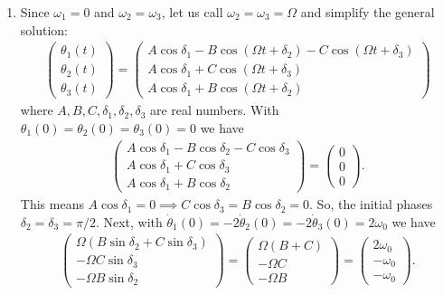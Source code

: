 \documentclass{article}
\theoremstyle{definition}
\begin{document}
\begin{enumerate}[label=(\alph*)]
	\item Since $\omega_1 = 0$ and $\omega_2=\omega_3$, let us call $\omega_2 = \omega_3 = \Omega$ and simplify the general solution: 
	\begin{align*}
	\begin{pmatrix}
	\theta_1(t)\\
	\theta_2(t)\\
	\theta_3(t)
	\end{pmatrix}=
	\begin{pmatrix}
	A\cos\delta_1 - B\cos(\Omega t + \delta_2) - C\cos(\Omega t + \delta_3)\\
	A \cos\delta_1 + C\cos(\Omega t + \delta_3) \\
	A \cos\delta_1 + B\cos(\Omega t + \delta_2)
	\end{pmatrix}
	\end{align*}
	where $A,B,C,\delta_1,\delta_2,\delta_3$ are real numbers. With $\theta_1(0) = \theta_2(0) = \theta_3(0) = 0$ we have
	\begin{align*}
	\begin{pmatrix}
	A\cos\delta_1 - B\cos\delta_2 - C\cos\delta_3 \\
	A\cos\delta_1+C\cos\delta_3 \\
	A\cos\delta_1+B\cos\delta_2
	\end{pmatrix}
	= \begin{pmatrix}
	0\\0\\0
	\end{pmatrix}.
	\end{align*}
	This means $A\cos\delta_1 = 0 \implies C\cos\delta_3 = B\cos\delta_2 = 0$. So, the initial phases $\delta_2 = \delta_3 = \pi/2$. Next, with $\dot\theta_1(0) = -2\dot\theta_2(0) = -2\dot\theta_3(0) = 2\omega_0$ we have
	\begin{align*}
	\begin{pmatrix}
	\Omega (B\sin\delta_2 + C\sin\delta_3) \\ 
	-\Omega C\sin\delta_3 \\
	-\Omega B\sin\delta_2  
	\end{pmatrix}
	=
	\begin{pmatrix}
	\Omega(B+C)\\ -\Omega C \\ -\Omega B
	\end{pmatrix}
	=
	\begin{pmatrix}
	2\omega_0 \\-\omega_0 \\ -\omega_0
	\end{pmatrix}.

\end{align*}
\end{enumerate}
\end{document}

